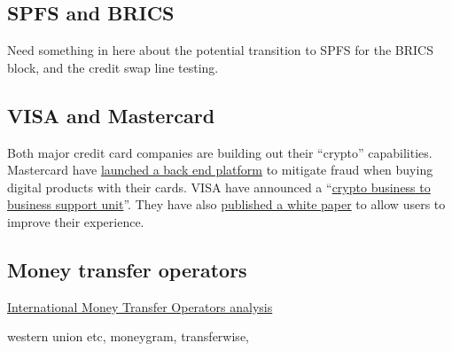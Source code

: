\subsection{SPFS and BRICS}
Need something in here about the potential transition to SPFS for the BRICS block, and the credit swap line testing.
\subsection{VISA and Mastercard}
Both major credit card companies are building out their ``crypto'' capabilities. Mastercard have \href{https://finance.yahoo.com/news/mastercard-crypto-secure-200559003.html}{launched a back end platform} to mitigate fraud when buying digital products with their cards. VISA have announced a ``\href{https://investor.visa.com/news/news-details/2021/Visa-Introduces-Crypto-Advisory-Services-to-Help-Partners-Navigate-a-New-Era-of-Money-Movement/default.aspx}{crypto business to business support unit}''. They have also \href{https://usa.visa.com/solutions/crypto/auto-payments-for-self-custodial-wallets.html}{published a white paper} to allow users to improve their experience.
\subsection{Money transfer operators}

\href{https://www.toptal.com/finance/market-research-analysts/international-money-transfer}{International Money Transfer Operators analysis}

western union etc, moneygram, transferwise,
